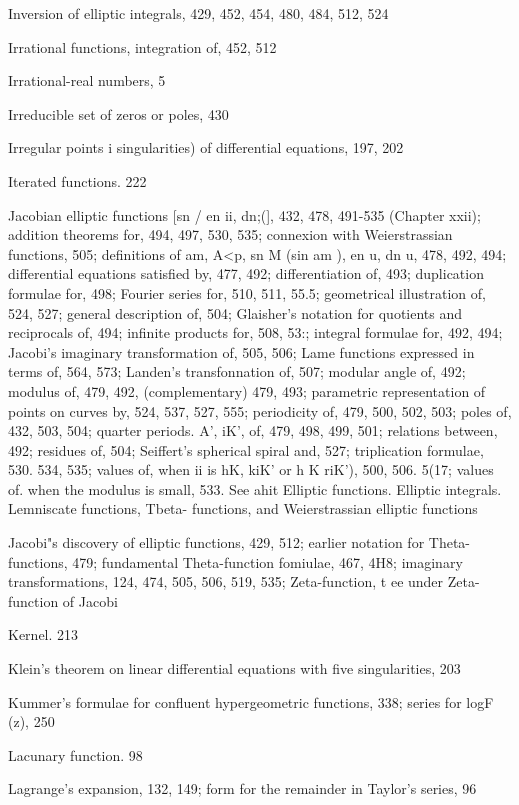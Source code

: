 Inversion of elliptic integrals, 429, 452, 454, 480, 484, 512, 524

Irrational functions, integration of, 452, 512

Irrational-real numbers, 5

%
%

Irreducible set of zeros or poles, 430

Irregular points i singularities) of differential equations, 197, 202

Iterated functions. 222

Jacobian elliptic functions [sn /  en ii, dn;(], 432, 478, 491-535 (Chapter xxii); addition theorems
for, 494, 497, 530, 535; connexion with Weierstrassian functions, 505; definitions of am,
A<p, sn M (sin am  ), en u, dn u, 478, 492, 494; differential equations satisfied by, 477, 492;
differentiation of, 493; duplication formulae for, 498; Fourier series for, 510, 511, 55.5;
geometrical illustration of, 524, 527; general description of, 504; Glaisher's notation for
quotients and reciprocals of, 494; infinite products for, 508, 53:; integral formulae for, 492,
494; Jacobi's imaginary transformation of, 505, 506; Lame functions expressed in terms of,
564, 573; Landen's transfonnation of, 507; modular angle of, 492; modulus of, 479, 492,
(complementary) 479, 493; parametric representation of points on curves by, 524, 537, 527,
555; periodicity of, 479, 500, 502, 503; poles of, 432, 503, 504; quarter periods. A', iK', of,
479, 498, 499, 501; relations between, 492; residues of, 504; Seiffert's spherical spiral and,
527; triplication formulae, 530. 534, 535; values of, when ii is hK, kiK' or h  K riK'), 500,
506. 5(17; values of. when the modulus is small, 533. See ahit Elliptic functions. Elliptic
integrals. Lemniscate functions, Tbeta- functions, and Weierstrassian elliptic functions

Jacobi"s discovery of elliptic functions, 429, 512; earlier notation for Theta-functions, 479;
fundamental Theta-function fomiulae, 467, 4H8; imaginary transformations, 124, 474, 505,
506, 519, 535; Zeta-function, t ee under Zeta-function of Jacobi

Kernel. 213

Klein's theorem on linear differential equations with five singularities, 203

Kummer's formulae for confluent hypergeometric functions, 338; series for logF (z), 250

Lacunary function. 98

Lagrange's expansion, 132, 149; form for the remainder in Taylor's series, 96

